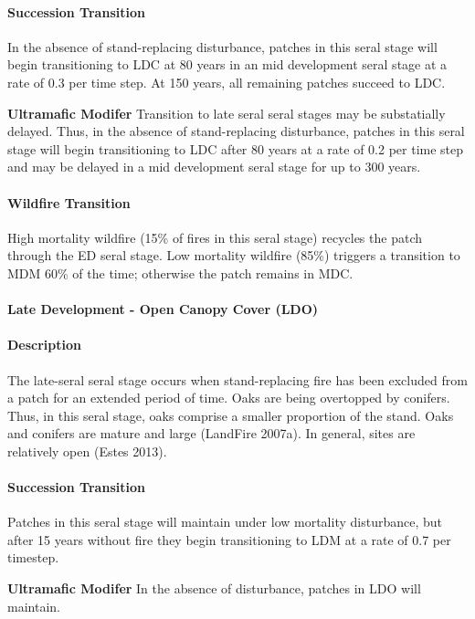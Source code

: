 \paragraph{Succession Transition} In the absence of stand-replacing disturbance, patches in this seral stage will begin transitioning to LDC at 80 years in an mid development seral stage at a rate of 0.3 per time step. At 150 years, all remaining patches succeed to LDC.
\begin{adjustwidth}{2cm}{}

\textbf{Ultramafic Modifer}  Transition to late seral seral stages may be substatially delayed. Thus, in the absence of stand-replacing disturbance, patches in this seral stage will begin transitioning to LDC after 80 years at a rate of 0.2 per time step and may be delayed in a mid development seral stage for up to 300 years.

\end{adjustwidth}
\paragraph{Wildfire Transition} High mortality wildfire (15\% of fires in this seral stage) recycles the patch through the ED seral stage. Low mortality wildfire (85\%) triggers a transition to MDM 60\% of the time; otherwise the patch remains in MDC.


\noindent\hrulefill


\paragraph{Late Development - Open Canopy Cover (LDO)}

\paragraph{Description} The late-seral seral stage occurs when stand-replacing fire has been excluded from a patch for an extended period of time. Oaks are being overtopped by conifers. Thus, in this seral stage, oaks comprise a smaller proportion of the stand. Oaks and conifers are mature and large (LandFire 2007a). In general, sites are relatively open (Estes 2013).

\paragraph{Succession Transition} Patches in this seral stage will maintain under low mortality disturbance, but after 15 years without fire they begin transitioning to LDM at a rate of 0.7 per timestep. 
\begin{adjustwidth}{2cm}{}

\textbf{Ultramafic Modifer}  In the absence of disturbance, patches in LDO will maintain.

\end{adjustwidth}

